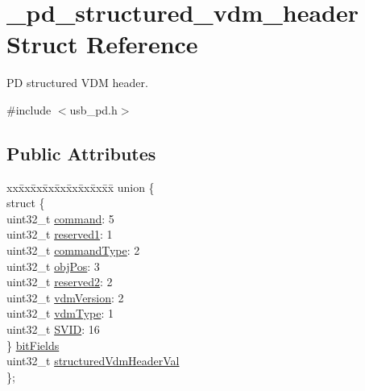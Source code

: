 \hypertarget{struct__pd__structured__vdm__header}{\section{\-\_\-pd\-\_\-structured\-\_\-vdm\-\_\-header Struct Reference}
\label{struct__pd__structured__vdm__header}
}


P\-D structured V\-D\-M header.  




{\ttfamily \#include $<$usb\-\_\-pd.\-h$>$}

\subsection*{Public Attributes}
\begin{DoxyCompactItemize}
\item 
\begin{tabbing}
xx\=xx\=xx\=xx\=xx\=xx\=xx\=xx\=xx\=\kill
union \{\\
\>struct \{\\
\>\>uint32\_t \hyperlink{struct__pd__structured__vdm__header_aada24db165d116acd79aa1a44a30d2e1}{command}: 5\\
\>\>uint32\_t \hyperlink{struct__pd__structured__vdm__header_ae96832372241f43fdbb0a364539d424f}{reserved1}: 1\\
\>\>uint32\_t \hyperlink{struct__pd__structured__vdm__header_a8146babffdd0022316369e0631995bf1}{commandType}: 2\\
\>\>uint32\_t \hyperlink{struct__pd__structured__vdm__header_a70c79769097f532657064784a5803022}{objPos}: 3\\
\>\>uint32\_t \hyperlink{struct__pd__structured__vdm__header_aced9840a12b97bb0e0acc6e4d72a3566}{reserved2}: 2\\
\>\>uint32\_t \hyperlink{struct__pd__structured__vdm__header_af95df1485673cf3bd9b62d4de0185a07}{vdmVersion}: 2\\
\>\>uint32\_t \hyperlink{struct__pd__structured__vdm__header_a096921553a1351b55e5419e8f5eac69a}{vdmType}: 1\\
\>\>uint32\_t \hyperlink{struct__pd__structured__vdm__header_a9b7bde8903697b83450597f27aceb370}{SVID}: 16\\
\>\} \hyperlink{struct__pd__structured__vdm__header_afc8471a70fa430820836286de3cf2281}{bitFields}\\
\>uint32\_t \hyperlink{struct__pd__structured__vdm__header_a0544fc4b30468ec5d5b435a05b30ced1}{structuredVdmHeaderVal}\\
\}; \\

\end{tabbing}\end{DoxyCompactItemize}


